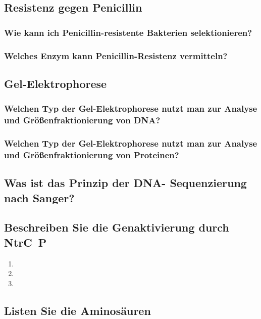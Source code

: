 \documentclass{article}
\begin{document}
\subsection*{Resistenz gegen Penicillin}
\subsubsection*{Wie kann ich Penicillin-resistente Bakterien
selektionieren?}
\bigskip\bigskip\bigskip
\subsubsection*{Welches Enzym kann Penicillin-Resistenz
vermitteln?}
\bigskip\bigskip\bigskip
\subsection*{Gel-Elektrophorese}
\subsubsection*{Welchen Typ der Gel-Elektrophorese nutzt
man zur Analyse und Größenfraktionierung
von DNA?}
\bigskip\bigskip\bigskip
\subsubsection*{Welchen Typ der Gel-Elektrophorese nutzt
man zur Analyse und Größenfraktionierung
von Proteinen?}
\bigskip\bigskip\bigskip\bigskip\bigskip\bigskip
\subsection*{Was ist das Prinzip der DNA-
Sequenzierung nach Sanger?}
\bigskip\bigskip\bigskip\bigskip\bigskip\bigskip
\subsection*{Beschreiben Sie die
Genaktivierung durch NtrC~P}
\begin{enumerate}
    \item 
\item 
\item 
\end{enumerate}

\subsection*{Listen Sie die Aminosäuren}
\bigskip\bigskip\bigskip
\bigskip\bigskip\bigskip
\bigskip\bigskip\bigskip
\end{document}

